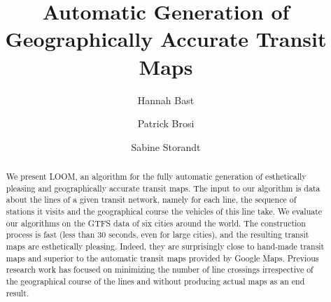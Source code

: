 \documentclass{llncs}
\begin{document}
%
\mainmatter
%
\title{Automatic Generation of Geographically Accurate Transit Maps}
%
%
\author{Hannah Bast \and Patrick Brosi \and
Sabine Storandt}
%
%
%

\maketitle

\begin{abstract}
	We present LOOM, an algorithm for the fully automatic generation of esthetically pleasing and geographically accurate transit maps.
	The input to our algorithm is data about the lines of a given transit network, namely for each line, the sequence of stations it visits and the
	geographical course the vehicles of this line take.
	We evaluate our algorithms on the GTFS data of six cities around the world.
	The construction process is fast (less than 30 seconds, even for large cities), and the resulting transit maps are esthetically pleasing.
	Indeed, they are surprisingly close to hand-made transit maps and superior to the automatic transit maps provided by Google Maps.
	Previous research work has focused on minimizing the number of line crossings irrespective of the geographical course of the lines and without
	producing actual maps as an end result.
\end{abstract}
\end{document}
